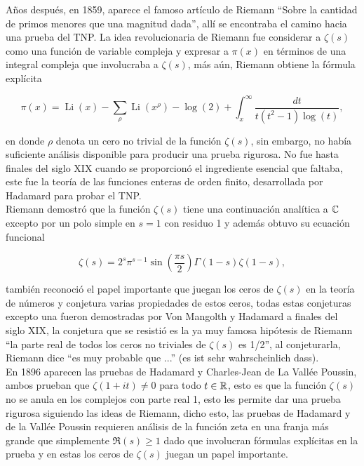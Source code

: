 Años después, en 1859, aparece el famoso artículo de Riemann ``Sobre la cantidad de primos menores que una magnitud dada'', allí se encontraba el camino hacia una prueba del TNP. La idea revolucionaria de Riemann fue considerar a $\zeta(s)$ como una función de variable compleja y expresar a $\pi(x)$ en términos de una integral compleja que involucraba a $\zeta(s)$, más aún, Riemann obtiene la fórmula explícita

$$\pi(x)=\operatorname{Li}(x)-\sum_\rho \operatorname{Li}\left(x^\rho\right)-\log (2)+\int_x^{\infty} \frac{d t}{t\left(t^2-1\right) \log (t)},$$

en donde $\rho$ denota un cero no trivial de la función $\zeta(s)$, sin embargo, no había suficiente análisis disponible para producir una prueba rigurosa. No fue hasta finales del siglo XIX cuando se proporcionó el ingrediente esencial que faltaba, este fue la teoría de las funciones enteras de orden finito, desarrollada por Hadamard para probar el TNP.\\

Riemann demostró que la función $\zeta(s)$ tiene una continuación analítica a $\mathbb{C}$ excepto por un polo simple en $s=1$ con residuo 1 y además obtuvo su ecuación funcional 

\[
\zeta(s) = 2^s \pi^{s-1} \sin\left(\frac{\pi s}{2}\right) \Gamma(1-s) \zeta(1-s),
\]

también reconoció el papel importante que juegan los ceros de $\zeta(s)$ en la teoría de números y conjetura varias propiedades de estos ceros, todas estas conjeturas excepto una fueron demostradas por Von Mangolth y Hadamard a finales del siglo XIX, la conjetura que se resistió es la ya muy famosa hipótesis de Riemann ``la parte real de todos los ceros no triviales de $\zeta(s)$ es 1/2'', al conjeturarla, Riemann dice ``es muy probable que ...'' (es ist sehr wahrscheinlich dass).\\

En 1896 aparecen las pruebas de Hadamard y Charles-Jean de La Vallée Poussin, ambos prueban que $\zeta(1+it)\neq 0$ para todo $t\in \mathbb{R}$, esto es que la función $\zeta(s)$ no se anula en los complejos con parte real 1, esto les permite dar una prueba rigurosa siguiendo las ideas de Riemann, dicho esto, las pruebas de Hadamard y de la Vallée Poussin requieren análisis de la función zeta en una franja más grande que simplemente $\Re(s)\geq 1$ dado que involucran fórmulas explícitas en la prueba y en estas los ceros de $\zeta(s)$ juegan un papel importante.\\

